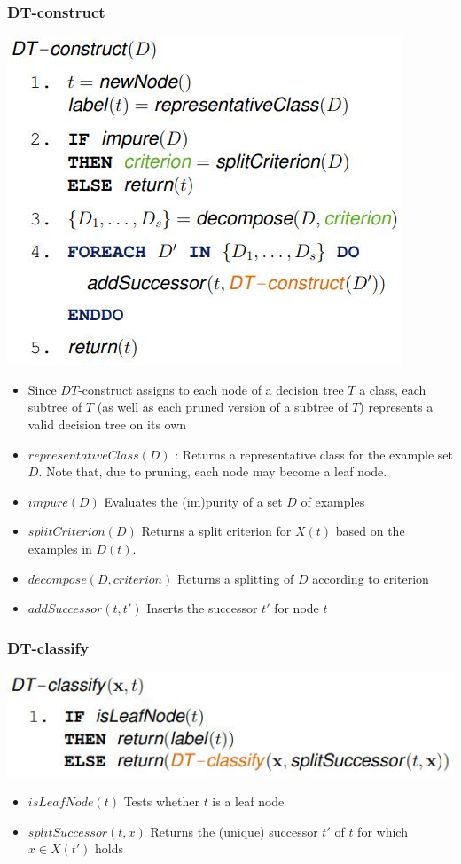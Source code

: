 \documentclass[11pt,a4paper]{article}
\begin{document}
\begin{flushleft}
\subsubsection{DT-construct}
\includegraphics[width= \textwidth]{construct}
\begin{itemize}
\item Since $DT$-construct assigns to each node of a decision tree $T$ a class, each subtree of $T$ (as
well as each pruned version of a subtree of $T$) represents a valid decision tree on its own
\item $representativeClass(D)$ : Returns a representative class for the example set $D$. Note that, due to pruning, each node may become a leaf node.
\item $impure(D)$ Evaluates the (im)purity of a set $D$ of examples
\item $splitCriterion(D)$ Returns a split criterion for $X(t)$ based on the examples in $D(t)$.
\item $decompose(D, criterion)$ Returns a splitting of $D$ according to criterion
\item $addSuccessor(t, t')$ Inserts the successor $t'$ for node $t$
\end{itemize}
\subsubsection{DT-classify}
\includegraphics[width= \textwidth]{classify}
\begin{itemize}
\item $isLeafNode(t)$ Tests whether $t$ is a leaf node
\item $splitSuccessor(t, x)$ Returns the (unique) successor $t'$ of $t$ for which $x \in X(t')$ holds
\end{itemize}

\end{flushleft}
\end{document}
